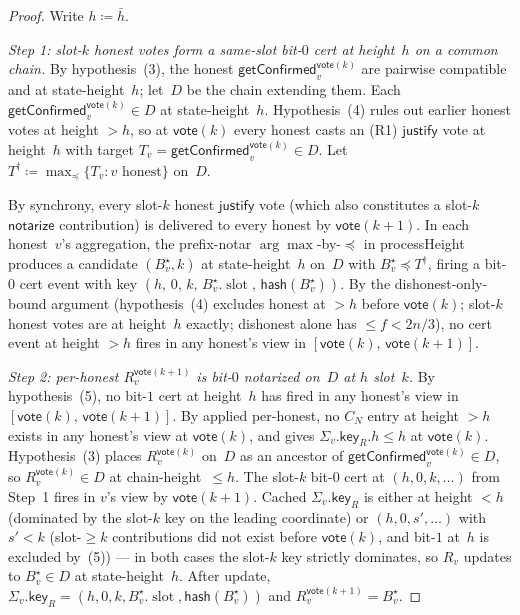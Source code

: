 \ifx\litemode\undefined\documentclass{article}\fi
\newcommand{\slot}[0]{\ensuremath{\operatorname{\mathrm{slot}}}}
\newcommand{\just}{\ensuremath{\mathsf{justify}}\xspace}
\newcommand{\notar}{\ensuremath{\mathsf{notarize}}\xspace}
\newcommand{\hash}{\mathsf{hash}}
\newcommand{\key}{\mathsf{key}}
\newcommand{\vote}{\mathsf{vote}}
\newcommand{\comm}[1]{\bar{#1}}
\newcommand{\processHeight}{\textsf{processHeight}\xspace}
\newcommand{\getConfirmed}{\textsf{getConfirmed}\xspace}
\theoremstyle{plain}
\theoremstyle{definition}
\theoremstyle{remark}
\begin{document}
\begin{proof}
Write $h \coloneqq \comm{h}$.

\emph{Step 1: slot-$k$ honest votes form a same-slot bit-$0$ cert at height~$h$ on a common chain.}
By hypothesis~(3), the honest $\getConfirmed_v^{\vote(k)}$ are pairwise compatible and at state-height~$h$; let~$D$ be the chain extending them. Each $\getConfirmed_v^{\vote(k)} \in D$ at state-height~$h$. Hypothesis~(4) rules out earlier honest votes at height $>h$, so at $\vote(k)$ every honest casts an (R1) \just vote at height~$h$ with target $T_v = \getConfirmed_v^{\vote(k)} \in D$. Let $T^\dagger \coloneqq \max_\preceq \{T_v : v \text{ honest}\}$ on~$D$.

By synchrony, every slot-$k$ honest \just vote (which also constitutes a slot-$k$ \notar contribution) is delivered to every honest by $\vote(k+1)$. In each honest~$v$'s aggregation, the prefix-notar $\arg\max$-by-$\preceq$ in \processHeight{} produces a candidate $(B^\star_v, k)$ at state-height~$h$ on~$D$ with $B^\star_v \preceq T^\dagger$, firing a bit-$0$ cert event with key $(h,\, 0,\, k,\, B^\star_v.\slot,\, \hash(B^\star_v))$. By the dishonest-only-bound argument (hypothesis~(4) excludes honest at $>h$ before $\vote(k)$; slot-$k$ honest votes are at height~$h$ exactly; dishonest alone has $\leq f < 2n/3$), no cert event at height $>h$ fires in any honest's view in $[\vote(k),\, \vote(k+1)]$.

\emph{Step 2: per-honest $R_v^{\vote(k+1)}$ is bit-$0$ notarized on~$D$ at $h$ slot~$k$.}
By hypothesis~(5), no bit-$1$ cert at height~$h$ has fired in any honest's view in $[\vote(k),\, \vote(k+1)]$. By  applied per-honest, no $C_N$ entry at height $>h$ exists in any honest's view at $\vote(k)$, and  gives $\Sigma_v.\key_R.h \leq h$ at $\vote(k)$.
Hypothesis~(3) places $R_v^{\vote(k)}$ on~$D$ as an ancestor of $\getConfirmed_v^{\vote(k)} \in D$, so $R_v^{\vote(k)} \in D$ at chain-height~$\leq h$.
The slot-$k$ bit-$0$ cert at $(h, 0, k, \ldots)$ from Step~1 fires in $v$'s view by $\vote(k+1)$. Cached $\Sigma_v.\key_R$ is either at height $<h$ (dominated by the slot-$k$ key on the leading coordinate) or $(h, 0, s', \ldots)$ with $s' < k$ (slot-$\geq k$ contributions did not exist before $\vote(k)$, and bit-$1$ at~$h$ is excluded by~(5)) — in both cases the slot-$k$ key strictly dominates, so $R_v$ updates to $B^\star_v \in D$ at state-height~$h$. After update, $\Sigma_v.\key_R = (h, 0, k, B^\star_v.\slot, \hash(B^\star_v))$ and $R_v^{\vote(k+1)} = B^\star_v$.


\end{proof}
\end{document}
